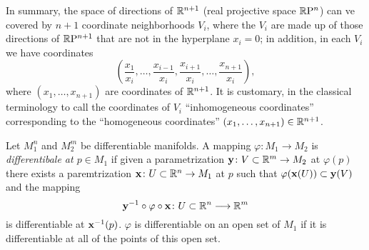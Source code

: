 \begin{example}
  In summary, the space of directions of \(\mathbb{R}^{n+1}\) (real projective
  space \(\mathbb{R}\mathrm{P}^n\)) can ve covered by \(n+1\) coordinate neighborhoods
  \(V_i\), where the \(V_i\) are made up of those directions of
  \(\mathbb{R}\mathrm{P}^{n+1}\) that are not in the hyperplane \(x_i=0\); in addition,
  in each \(V_i\) we have coordinates
  \[
    \left(\frac{x_1}{x_i},\dotsc,\frac{x_{i-1}}{x_i},
    \frac{x_{i+1}}{x_i},\dotsc,\frac{x_{n+1}}{x_i}\right),
  \]
  where \((x_1,\dotsc,x_{n+1})\) are coordinates of \(\mathbb{R}^{n+1}\). It is
  customary, in the classical terminology to call the coordinates of
  \(V_i\) ``inhomogeneous coordinates'' corresponding to the ``homogeneous
  coordinates'' \((x_1,\dotsc,x_{n+1})\in\mathbb{R}^{n+1}\).
\end{example}

\begin{definition}
  Let \(M_1^n\) and \(M_2^m\) be differentiable manifolds. A mapping
  \(\varphi\colon M_1\to M_2\) is \emph{differentibale at \(p\in M_1\)} if
  given a parametrization \(\mathbf{y}\colon V\subset\mathbb{R}^m\to M_2\) at
  \(\varphi(p)\) there exists a paremtrization \(\mathbf{x}\colon
  U\subset\mathbb{R}^n\to M_1\) at \(p\) such that
  \(\varphi(\mathbf{x}(U))\subset\mathbf{y}(V)\) and the mapping
  \[
    \mathbf{y}^{-1}\circ\varphi\circ\mathbf{x}\colon U\subset\mathbb{R}^n\longrightarrow\mathbb{R}^m
  \]
  is differentiable at \(\mathbf{x}^{-1}(p)\). \(\varphi\) is differentiable on
  an open set of \(M_1\) if it is differentiable at all of the points of
  this open set.
\end{definition}

